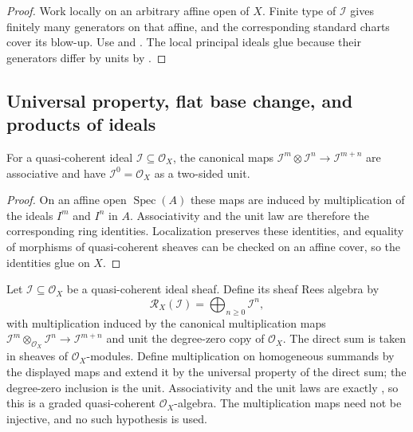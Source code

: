 \begin{proof}
  Work locally on an arbitrary affine open of $X$.  Finite type of
  $\mathcal I$ gives finitely many generators on that affine, and the
  corresponding standard charts cover its blow-up.  Use
   and
  .  The local principal ideals
  glue because their generators differ by units by
  .
\end{proof}

\subsection{Universal property, flat base change, and products of ideals}

\begin{lemma}
  \label{lemma:nagata-sheaf-ideal-powers-assoc}

  For a quasi-coherent ideal $\mathcal I\subseteq\mathcal O_X$, the canonical
  maps $\mathcal I^m\otimes\mathcal I^n\to\mathcal I^{m+n}$ are associative
  and have $\mathcal I^0=\mathcal O_X$ as a two-sided unit.
\end{lemma}

\begin{proof}
  On an affine open $\operatorname{Spec}(A)$ these maps are induced by
  multiplication of the ideals $I^m$ and $I^n$ in $A$.  Associativity and the
  unit law are therefore the corresponding ring identities.  Localization
  preserves these identities, and equality of morphisms of quasi-coherent
  sheaves can be checked on an affine cover, so the identities glue on $X$.
\end{proof}

\begin{definition}
  \label{def:nagata-sheaf-rees-algebra}

  Let $\mathcal I\subseteq\mathcal O_X$ be a quasi-coherent ideal sheaf.  Define
  its sheaf Rees algebra by
  \[
    \mathcal R_X(\mathcal I)=\bigoplus_{n\geq0}\mathcal I^n,
  \]
  with multiplication induced by the canonical multiplication maps
  $\mathcal I^m\otimes_{\mathcal O_X}\mathcal I^n\to
  \mathcal I^{m+n}$ and unit the degree-zero copy of $\mathcal O_X$.
  The direct sum is taken in sheaves of $\mathcal O_X$-modules.  Define
  multiplication on homogeneous summands by the displayed maps and extend it
  by the universal property of the direct sum; the degree-zero inclusion is
  the unit.  Associativity and the unit laws are exactly
  , so this is a graded
  quasi-coherent $\mathcal O_X$-algebra.  The multiplication maps need not be
  injective, and no such hypothesis is used.
\end{definition}

